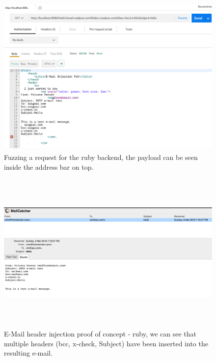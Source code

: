 \begin{figure}[!htbp]
	\centering
	\includegraphics[width=14cm, height=8cm]{System/EMI_Postman_Ruby}
	\caption[]{Fuzzing a request for the ruby backend, the payload can be seen inside the address bar on top.}
	\label{fig:postmanruby}
\end{figure}

\begin{figure}[!htbp]
	\centering
	\includegraphics[width=14cm, height=8cm]{System/EMI_Mailcatcher_Ruby}
	\caption[]{E-Mail header injection proof of concept - ruby, we can see that multiple headers (bcc, x-check, Subject) have been inserted into the resulting e-mail.}
	\label{fig:mailcatcherruby}
\end{figure}

